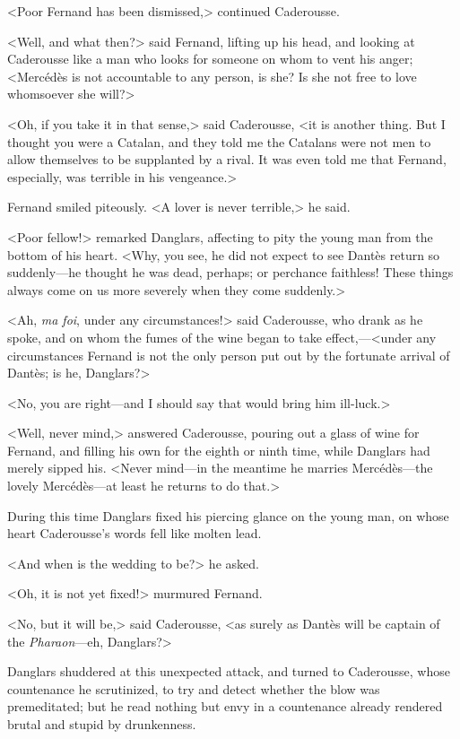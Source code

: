  <Poor Fernand has been dismissed,> continued Caderousse. 

 <Well, and what then?> said Fernand, lifting up his head, and looking at Caderousse like a man who looks for someone on whom to vent his anger; <Mercédès is not accountable to any person, is she? Is she not free to love whomsoever she will?> 

 <Oh, if you take it in that sense,> said Caderousse, <it is another thing. But I thought you were a Catalan, and they told me the Catalans were not men to allow themselves to be supplanted by a rival. It was even told me that Fernand, especially, was terrible in his vengeance.> 

 Fernand smiled piteously. <A lover is never terrible,> he said. 

 <Poor fellow!> remarked Danglars, affecting to pity the young man from the bottom of his heart. <Why, you see, he did not expect to see Dantès return so suddenly—he thought he was dead, perhaps; or perchance faithless! These things always come on us more severely when they come suddenly.> 

 <Ah, \textit{ma foi}, under any circumstances!> said Caderousse, who drank as he spoke, and on whom the fumes of the wine began to take effect,—<under any circumstances Fernand is not the only person put out by the fortunate arrival of Dantès; is he, Danglars?> 

 <No, you are right—and I should say that would bring him ill-luck.> 

 <Well, never mind,> answered Caderousse, pouring out a glass of wine for Fernand, and filling his own for the eighth or ninth time, while Danglars had merely sipped his. <Never mind—in the meantime he marries Mercédès—the lovely Mercédès—at least he returns to do that.> 

 During this time Danglars fixed his piercing glance on the young man, on whose heart Caderousse's words fell like molten lead. 

 <And when is the wedding to be?> he asked. 

 <Oh, it is not yet fixed!> murmured Fernand. 

 <No, but it will be,> said Caderousse, <as surely as Dantès will be captain of the \textit{Pharaon}—eh, Danglars?> 

 Danglars shuddered at this unexpected attack, and turned to Caderousse, whose countenance he scrutinized, to try and detect whether the blow was premeditated; but he read nothing but envy in a countenance already rendered brutal and stupid by drunkenness. 

